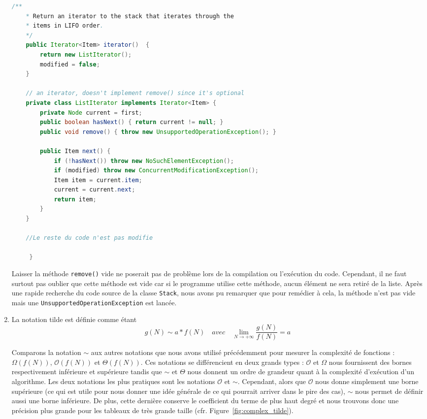 \begin{enumerate}
\begin{lstlisting}[language=Java]
    /**
    * Return an iterator to the stack that iterates through the 
    * items in LIFO order.
    */
    public Iterator<Item> iterator()  { 
    	return new ListIterator();
    	modified = false;
    }

    // an iterator, doesn't implement remove() since it's optional
    private class ListIterator implements Iterator<Item> {
        private Node current = first;
        public boolean hasNext() { return current != null; }
        public void remove() { throw new UnsupportedOperationException(); }

        public Item next() {
            if (!hasNext()) throw new NoSuchElementException();
            if (modified) throw new ConcurrentModificationException();
            Item item = current.item;
            current = current.next; 
            return item;
        }
    }
    
    //Le reste du code n'est pas modifie
	 
	 }
	 \end{lstlisting}
	 \vspace{0.5cm}
	 
        Laisser la méthode \lstinline{remove()} vide
        ne poserait pas de problème lors de la compilation ou
        l'exécution du code. Cependant, il ne faut surtout pas
        oublier que cette méthode est vide car si le programme
        utilise cette méthode, aucun élément ne sera retiré de
        la liste. Après une rapide recherche du code source de
        la classe \lstinline{Stack}, nous avons pu remarquer que pour remédier
        à cela, la méthode n'est pas vide mais une
        \lstinline{UnsupportedOperationException} est lancée.
	 
	\item La notation tilde est définie comme étant\cite{tilde-pdf}
        $$g(N) \sim a * f(N) \quad avec \quad \lim\limits_{N
        \longrightarrow +\infty} \frac{g(N)}{f(N)} = a$$

	Comparons la notation $\sim$ aux autres notations que
        nous avons utilisé précédemment pour mesurer la complexité
        de fonctions :
	$\Omega(f(N))$, $\mathcal{O}(f(N))$ et $\Theta(f(N))$.
	Ces notations se différencient en deux grands types :
        $\mathcal{O}$ et $\Omega$ nous fournissent des bornes
        respectivement inférieure et supérieure tandis que $\sim$
        et $\Theta$ nous donnent un ordre de grandeur quant à la
        complexité d'exécution d'un algorithme.
	Les deux notations les plus pratiques sont les notations
        $\mathcal{O}$ et $\sim$. Cependant, alors que $\mathcal{O}$
        nous donne simplement une borne supérieure (ce qui est utile
        pour nous donner une idée générale de ce qui pourrait arriver
        dans le pire des cas), $\sim$ nous permet de définir aussi une
        borne inférieure. De plus, cette dernière conserve le coefficient
        du terme de plus haut degré et nous trouvons donc une précision
        plus grande pour les tableaux de très grande taille
        (cfr. Figure~\ref{fig:complex_tilde}).


\end{enumerate}
